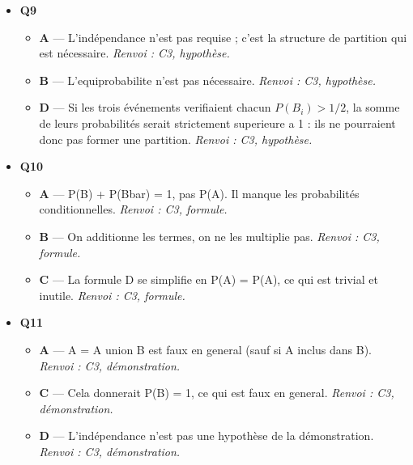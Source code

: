 \begin{itemize}
  \begin{itemize}
    \item \textbf{A} — L'élève a recopie $P_{\overline B}(A)=1/4$ sans ponderer les deux branches de la partition. \emph{Renvoi : C3, formule.}
    \item \textbf{C} — L'élève additionne $1/6$ et la probabilité conditionnelle $1/4$ sans la ponderer par $P(\overline B)=2/3$ ; le second terme vaut $1/6$. \emph{Renvoi : C3, formule.}
    \item \textbf{D} — L'élève a calcule seulement $P(B)P_B(A)=1/6$ et oublie le second chemin $P(\overline B)P_{\overline B}(A)=1/6$. \emph{Renvoi : C3, formule.}
  \end{itemize}
  \item \textbf{Q9}
  \begin{itemize}
    \item \textbf{A} — L'indépendance n'est pas requise ; c'est la structure de partition qui est nécessaire. \emph{Renvoi : C3, hypothèse.}
    \item \textbf{B} — L'equiprobabilite n'est pas nécessaire. \emph{Renvoi : C3, hypothèse.}
    \item \textbf{D} — Si les trois événements verifiaient chacun $P(B_i)>1/2$, la somme de leurs probabilités serait strictement superieure a 1 : ils ne pourraient donc pas former une partition. \emph{Renvoi : C3, hypothèse.}
  \end{itemize}
  \item \textbf{Q10}
  \begin{itemize}
    \item \textbf{A} — P(B) + P(Bbar) = 1, pas P(A). Il manque les probabilités conditionnelles. \emph{Renvoi : C3, formule.}
    \item \textbf{B} — On additionne les termes, on ne les multiplie pas. \emph{Renvoi : C3, formule.}
    \item \textbf{C} — La formule D se simplifie en P(A) = P(A), ce qui est trivial et inutile. \emph{Renvoi : C3, formule.}
  \end{itemize}
  \item \textbf{Q11}
  \begin{itemize}
    \item \textbf{A} — A = A union B est faux en general (sauf si A inclus dans B). \emph{Renvoi : C3, démonstration.}
    \item \textbf{C} — Cela donnerait P(B) = 1, ce qui est faux en general. \emph{Renvoi : C3, démonstration.}
    \item \textbf{D} — L'indépendance n'est pas une hypothèse de la démonstration. \emph{Renvoi : C3, démonstration.}

\end{itemize}
\end{itemize}
